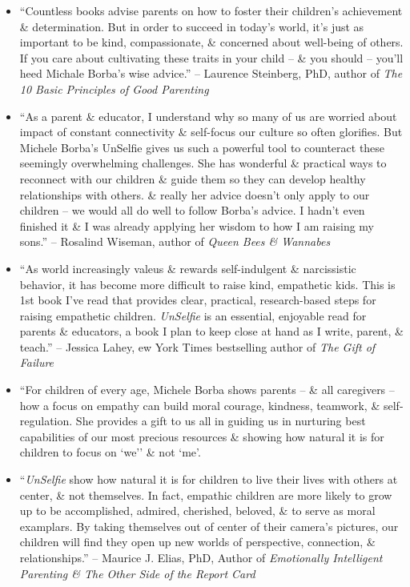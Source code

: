 \documentclass{article}
\begin{document}
\begin{enumerate}
\begin{itemize}
		\item ``Countless books advise parents on how to foster their children's achievement \& determination. But in order to succeed in today's world, it's just as important to be kind, compassionate, \& concerned about well-being of others. If you care about cultivating these traits in your child -- \& you should -- you'll heed {\sc Michale Borba}'s wise advice.'' -- {\sc Laurence Steinberg}, PhD, author of {\it The 10 Basic Principles of Good Parenting}
		\item ``As a parent \& educator, I understand why so many of us are worried about impact of constant connectivity \& self-focus our culture so often glorifies. But {\sc Michele Borba}'s UnSelfie gives us such a powerful tool to counteract these seemingly overwhelming challenges. She has wonderful \& practical ways to reconnect with our children \& guide them so they can develop healthy relationships with others. \& really her advice doesn't only apply to our children -- we would all do well to follow {\sc Borba}'s advice. I hadn't even finished it \& I was already applying her wisdom to how I am raising my sons.'' -- {\sc Rosalind Wiseman}, author of {\it Queen Bees \& Wannabes}
		\item ``As world increasingly valeus \& rewards self-indulgent \& narcissistic behavior, it has become more difficult to raise kind, empathetic kids. This is 1st book I've read that provides clear, practical, research-based steps for raising empathetic children. {\it UnSelfie} is an essential, enjoyable read for parents \& educators, a book I plan to keep close at hand as I write, parent, \& teach.'' -- {\sc Jessica Lahey}, ew York Times bestselling author of {\it The Gift of Failure}
		\item ``For children of every age, {\sc Michele Borba} shows parents -- \& all caregivers -- how a focus on empathy can build moral courage, kindness, teamwork, \& self-regulation. She provides a gift to us all in guiding us in nurturing best capabilities of our most precious resources \& showing how natural it is for children to focus on `we'' \& not `me'.
		\item ``{\it UnSelfie} show how natural it is for children to live their lives with others at center, \& not themselves. In fact, empathic children are more likely to grow up to be accomplished, admired, cherished, beloved, \& to serve as moral examplars. By taking themselves out of center of their camera's pictures, our children will find they open up new worlds of perspective, connection, \& relationships.'' -- {\sc Maurice J. Elias}, PhD, Author of {\it Emotionally Intelligent Parenting \& The Other Side of the Report Card}

\end{itemize}
\end{enumerate}
\end{document}
